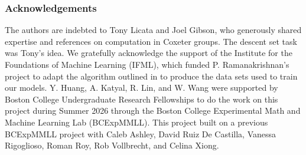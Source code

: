 \documentclass{article}
\begin{document}
\subsubsection*{Acknowledgements}
The authors are indebted to Tony Licata and Joel Gibson, who generously shared expertise and references on computation in Coxeter groups. The descent set task was Tony's idea. We gratefully acknowledge the support of the Institute for the Foundations of Machine Learning (IFML), which funded P. Ramanakrishnan's project to adapt the algorithm outlined in \citet{casselman2008computationcoxetergroupsii} to produce the data sets used to train our models. Y. Huang, A. Katyal, R. Lin, and W. Wang were supported by Boston College Undergraduate Research Fellowships to do the work on this  project during Summer 2026 through the Boston College Experimental Math and Machine Learning Lab (BCExpMMLL). This project built on a previous BCExpMMLL project with Caleb Ashley, David Ruiz De Castilla, Vanessa Rigoglioso, Roman Roy, Rob Vollbrecht, and Celina Xiong. 

\end{document}
